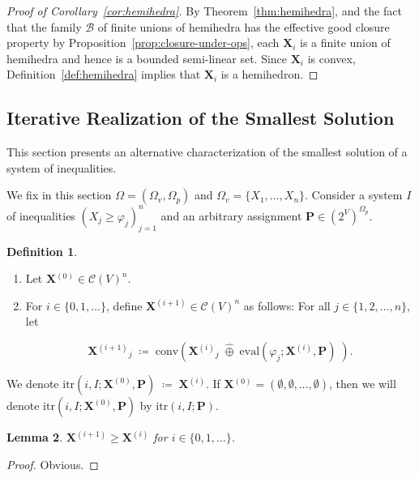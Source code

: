 \documentclass[10pt]{amsart}
\theoremstyle{plain}
\newtheorem{lemma}{Lemma}[section]
\theoremstyle{definition}
\newtheorem{definition}[lemma]{Definition}
\providecommand{\cC}[0]{\ensuremath{\mathcal C}\xspace}
\providecommand{\bP}[0]{\ensuremath{\mathbf P}\xspace}
\providecommand{\bX}[0]{\ensuremath{\mathbf X}\xspace}
\let\geq\geqslant
\providecommand{\defeq}[0]{\ensuremath{\;\coloneqq\;}\xspace}
\providecommand{\p}[1]{\ensuremath{^{\left(#1\right)}}\xspace}
\providecommand{\cplus}[0]{\ensuremath{\hat{\oplus}}\xspace}
\providecommand{\conv}[1]{\ensuremath{\mathrm{conv}{\left({#1}\right)}\xspace}}
\providecommand{\convset}[0]{\ensuremath{\cC}\xspace}
\providecommand{\evalmap}[0]{\ensuremath{\mathrm{eval}}\xspace}
\providecommand{\itr}[0]{\ensuremath{\mathrm{itr}}\xspace}
\begin{document}
\begin{proof}[Proof of Corollary~\ref{cor:hemihedra}]
By Theorem~\ref{thm:hemihedra}, 
and the fact that the family $\mathcal{B}$ of finite unions of hemihedra has the effective good closure property by Proposition~\ref{prop:closure-under-ops},
each \(\bX_i\) is a finite union of hemihedra and hence is
a bounded semi-linear set. Since \(\bX_i\) is convex, Definition~\ref{def:hemihedra}
implies that \(\bX_i\) is a hemihedron.
\end{proof}




\subsection{Iterative Realization of the Smallest Solution}
\label{subsec:op-real}
This section presents an alternative characterization of the smallest solution of a system of inequalities. 

We fix in this section 
$\Omega = (\Omega_v,\Omega_p)$ and $\Omega_v = \{X_1,\ldots,X_n\}$.
Consider a system $I$ of inequalities 
$\left( X_j \geq \varphi_j \right)_{j=1}^n$ and an 
arbitrary assignment 
$\bP \in (2^V)^{\Omega_p}$.

\begin{definition}
    \label{def:itr}
    \begin{enumerate}
        \item Let $\bX\p 0 
        \in\convset(V)^n$.
        
        \item For $i\in\{0,1,\dotsc\}$, define $\bX\p{i+1}\in\convset(V)^n$ as follows:
            For all $j\in \{1,2,\dotsc,n\}$, let 
                
                $$\bX\p{i+1}_j \defeq \conv{\bX\p{i}_j \;\cplus\; \evalmap\left(\varphi_j ; \bX\p i,\bP \right) \; }.$$
    \end{enumerate}
    We denote $\itr(i,I;\bX^{(0)},\bP) \defeq \bX\p i$. If
    $\bX\p 0= (\emptyset,\emptyset,\dotsc,\emptyset)$, then we will denote
    $\itr(i,I;\bX^{(0)},\bP)$ by $\itr(i,I;\bP)$.
\end{definition}

\begin{lemma}
    \label{lem:itr1}
    $\bX\p{i+1}\geq \bX\p i$ for $i\in \{0,1,\dotsc\}$.
\end{lemma}
\begin{proof}
Obvious.
\end{proof}
\end{document}

